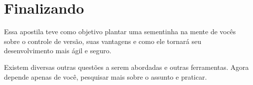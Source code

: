 \documentclass[12pt,openright,oneside,a4paper,english,brazil]{abntex2}
\begin{document}
\chapter*{Finalizando}

Essa apostila teve como objetivo plantar uma sementinha na mente de vocês sobre o controle de versão, suas vantagens e como ele tornará seu desenvolvimento mais ágil e seguro.


  Existem diversas outras questões a serem abordadas e outras ferramentas. Agora depende apenas de você, pesquisar mais sobre o assunto e praticar.

%
\nocite{book}
\nocite{gitlab}
\nocite{gitflow}
\nocite{semver}
\nocite{gitready}
\nocite{stackoverflow}
\nocite{atlassian}
\nocite{ndpsoftware}
\nocite{rogerdudler}
\nocite{danielkummer}
\nocite{nvie}
\nocite{cgti}
\nocite{moura}
\nocite{wikiversity}
\nocite{stackoverflow2}
\nocite{tribo}
\nocite{devmedia1}
\nocite{devmedia2}
\nocite{marklodato}


	 		
\end{document}
